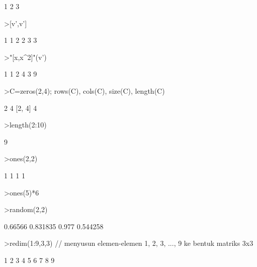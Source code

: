 \documentclass[a4paper,11pt,oneside,enabledeprecatedfontcommands]{scrbook}
\newenvironment{eulernotebook}{}{}
\begin{document}
\begin{eulernotebook}
\begin{euleroutput}
            1             2             3 
\end{euleroutput}
\begin{eulerprompt}
>[v',v']
\end{eulerprompt}
\begin{euleroutput}
            1             1 
            2             2 
            3             3 
\end{euleroutput}
\begin{eulerprompt}
>"[x,x^2]"(v')
\end{eulerprompt}
\begin{euleroutput}
            1             1 
            2             4 
            3             9 
\end{euleroutput}
\begin{eulerprompt}
>C=zeros(2,4); rows(C), cols(C), size(C), length(C)
\end{eulerprompt}
\begin{euleroutput}
2
4
[2,  4]
4
\end{euleroutput}
\begin{eulerprompt}
>length(2:10)
\end{eulerprompt}
\begin{euleroutput}
9
\end{euleroutput}
\begin{eulerprompt}
>ones(2,2)
\end{eulerprompt}
\begin{euleroutput}
            1             1 
            1             1 
\end{euleroutput}
\begin{eulerprompt}
>ones(5)*6
\end{eulerprompt}
\begin{euleroutput}
[6,  6,  6,  6,  6]
\end{euleroutput}
\begin{eulerprompt}
>random(2,2)
\end{eulerprompt}
\begin{euleroutput}
      0.66566      0.831835 
        0.977      0.544258 
\end{euleroutput}
\begin{eulerprompt}
>redim(1:9,3,3) // menyusun elemen-elemen 1, 2, 3, ..., 9 ke bentuk matriks 3x3
\end{eulerprompt}
\begin{euleroutput}
            1             2             3 
            4             5             6 
            7             8             9 
\end{euleroutput}

\end{eulernotebook}
\end{document}
